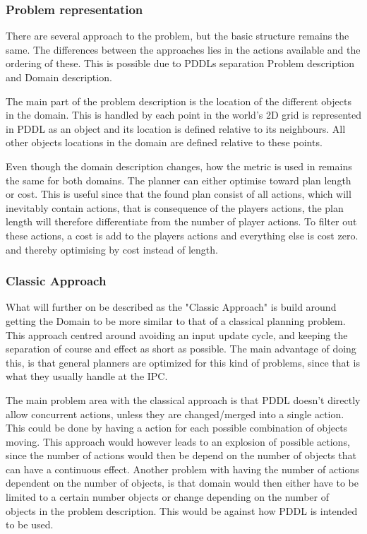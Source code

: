 		\subsubsection{Problem representation}
		There are several approach to the problem, but the basic structure remains the same. The differences between the approaches lies in the actions available and the ordering of these. This is possible due to PDDLs separation Problem description and Domain description.
		
		The main part of the problem description is the location of the different objects in the domain. This is handled by each point in the world's 2D grid is represented in PDDL as an object and its location is defined relative to its neighbours. All other objects locations in the domain are defined relative to these points.
		

		
		Even though the domain description changes, how the metric is used in remains the same for both domains. The planner can either optimise toward plan length or cost. This is useful since that the found plan consist of all actions, which will inevitably contain actions, that is consequence of the players actions, the plan length will therefore differentiate from the number of player actions. To filter out these actions, a cost is add to the players actions and everything else is cost zero. and thereby optimising by cost instead of length.
	
		
		\subsubsection{Classic Approach}
		What will further on be described as the "Classic Approach" is build around getting the Domain to be more similar to that of a classical planning problem. 
		This approach centred around avoiding an input update cycle, and keeping the separation of course and effect as short as possible. The main advantage of doing this, is that general planners are optimized for this kind of problems, since that is what they usually handle at the IPC.
		
		The main problem area with the classical approach is that PDDL doesn't directly allow concurrent actions, unless they are changed/merged into a single action. This could be done by having a action for each possible combination of objects moving. This approach would however leads to an explosion of possible actions, since the number of actions would then be depend on the number of objects that can have a continuous effect. %
		Another problem with having the number of actions dependent on the number of objects, is that domain would then either have to be limited to a certain number objects or change depending on the number of objects in the problem description. This would be against how PDDL is intended to be used. 
	
